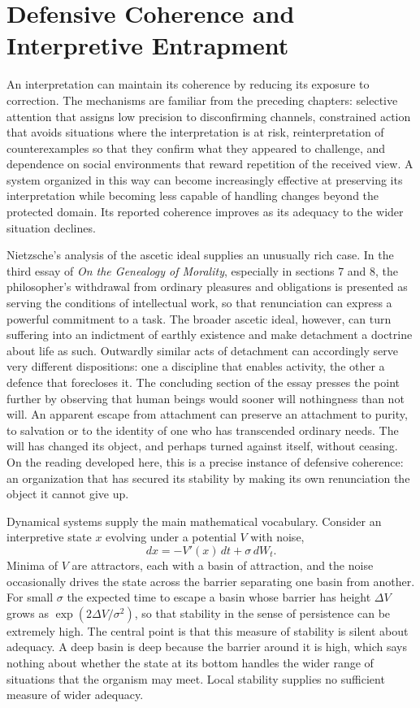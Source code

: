 \chapter{Defensive Coherence and Interpretive Entrapment}

An interpretation can maintain its coherence by reducing its exposure to correction. The mechanisms are familiar from the preceding chapters: selective attention that assigns low precision to disconfirming channels, constrained action that avoids situations where the interpretation is at risk, reinterpretation of counterexamples so that they confirm what they appeared to challenge, and dependence on social environments that reward repetition of the received view. A system organized in this way can become increasingly effective at preserving its interpretation while becoming less capable of handling changes beyond the protected domain. Its reported coherence improves as its adequacy to the wider situation declines.

Nietzsche's analysis of the ascetic ideal supplies an unusually rich case. In the third essay of \emph{On the Genealogy of Morality}, especially in sections 7 and 8, the philosopher's withdrawal from ordinary pleasures and obligations is presented as serving the conditions of intellectual work, so that renunciation can express a powerful commitment to a task. The broader ascetic ideal, however, can turn suffering into an indictment of earthly existence and make detachment a doctrine about life as such. Outwardly similar acts of detachment can accordingly serve very different dispositions: one a discipline that enables activity, the other a defence that forecloses it. The concluding section of the essay presses the point further by observing that human beings would sooner will nothingness than not will. An apparent escape from attachment can preserve an attachment to purity, to salvation or to the identity of one who has transcended ordinary needs. The will has changed its object, and perhaps turned against itself, without ceasing. On the reading developed here, this is a precise instance of defensive coherence: an organization that has secured its stability by making its own renunciation the object it cannot give up.

Dynamical systems supply the main mathematical vocabulary. Consider an interpretive state $x$ evolving under a potential $V$ with noise,
\[
dx=-V'(x)\,dt+\sigma\,dW_t .
\]
Minima of $V$ are attractors, each with a basin of attraction, and the noise occasionally drives the state across the barrier separating one basin from another. For small $\sigma$ the expected time to escape a basin whose barrier has height $\Delta V$ grows as $\exp(2\Delta V/\sigma^{2})$, so that stability in the sense of persistence can be extremely high. The central point is that this measure of stability is silent about adequacy. A deep basin is deep because the barrier around it is high, which says nothing about whether the state at its bottom handles the wider range of situations that the organism may meet. Local stability supplies no sufficient measure of wider adequacy.

